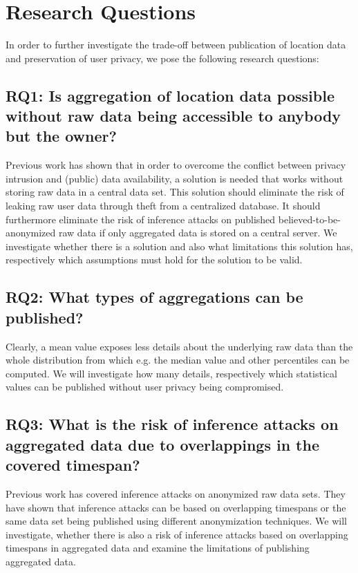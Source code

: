 \section{Research Questions}
In order to further investigate the trade-off between publication of location data and preservation of user privacy, we pose the following research questions:

\subsection*{RQ1: Is aggregation of location data possible without raw data being accessible to anybody but the owner?}
Previous work has shown that in order to overcome the conflict between privacy intrusion and (public) data availability, a solution is needed that works without storing raw data in a central data set.
This solution should eliminate the risk of leaking raw user data through theft from a centralized database. It should furthermore eliminate the risk of inference attacks on published believed-to-be-anonymized raw data if only aggregated data is stored on a central server. We investigate whether there is a solution and also what limitations this solution has, respectively which assumptions must hold for the solution to be valid.

\subsection*{RQ2: What types of aggregations can be published?}
Clearly, a mean value exposes less details about the underlying raw data than the whole distribution from which e.g. the median value and other percentiles can be computed. We will investigate how many details, respectively which statistical values can be published without user privacy being compromised.

\subsection*{RQ3: What is the risk of inference attacks on aggregated data due to overlappings in the covered timespan?}
Previous work has covered inference attacks on anonymized raw data sets. They have shown that inference attacks can be based on overlapping timespans or the same data set being published using different anonymization techniques. We will investigate, whether there is also a risk of inference attacks based on overlapping timespans in aggregated data and examine the limitations of publishing aggregated data.

